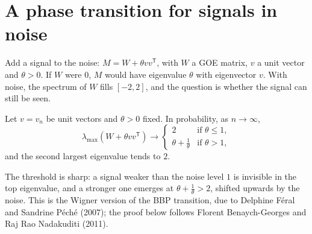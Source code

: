 \section{A phase transition for signals in noise}

Add a signal to the noise: $M=W+\theta vv^{\mathsf T}$, with $W$ a GOE matrix, $v$ a unit vector and $\theta>0$. If $W$ were $0$, $M$ would have eigenvalue $\theta$ with eigenvector $v$. With noise, the spectrum of $W$ fills
$[-2,2]$, and the question is whether the signal can still be seen.

\begin{theorem}\label{thm:spiked}
Let $v=v_n$ be unit vectors and $\theta>0$ fixed. In probability, as $n\to\infty$,
\[
\lambda_{\max}(W+\theta vv^{\mathsf T})\longrightarrow\begin{cases}2&\text{if }\theta\le1,\\\theta+\frac1\theta&\text{if }\theta>1,\end{cases}
\]
and the second largest eigenvalue tends to $2$.
\end{theorem}

The threshold is sharp: a signal weaker than the noise level $1$ is invisible in the top eigenvalue, and a stronger one emerges at $\theta+\frac1\theta>2$, shifted upwards by the noise. This is the Wigner version of the BBP
transition, due to Delphine F\'eral and Sandrine P\'ech\'e (2007); the proof below follows Florent Benaych-Georges and Raj Rao Nadakuditi (2011).

